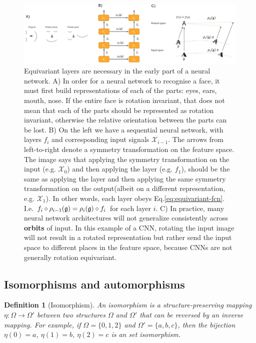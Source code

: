 \documentclass[11pt]{article}
\numberwithin{equation}{section}
\newtheorem{defn}{Definition}[section]
\begin{document}
\begin{figure}
\begin{center}
\includegraphics[width=\columnwidth]{../figures/invariance-equivariance.png}  
\end{center}
\caption{Equivariant layers are necessary in the early part of a neural network. A) In order for a neural network to recognise a face, it must first build representations of each of the parts: eyes, ears, mouth, nose. If the entire face is rotation invariant, that does not mean that each of the parts should be represented as rotation invariant, otherwise the relative orientation between the parts can be lost. B) On the left we have a sequential neural network, with layers $f_i$ and corresponding input signals $\mathcal{X}_{i-1}$. The arrows from left-to-right denote a symmetry transformation on the feature space. The image says that applying the symmetry transformation on the input (e.g. $\mathcal{X}_0$) and then applying the layer (e.g. $f_1$), should be the same as applying the layer and then applying the same symmetry transformation on the output(albeit on a different representation, e.g. $\mathcal{X}_1$). In other words, each layer obeys Eq.\eqref{eq:equivariant-fcn}. I.e. $f_i \circ \rho_{i-1}(\mathfrak{g}) = \rho_i(\mathfrak{g}) \circ f_i$ for each layer $i$. C) In practice, many neural network architectures will not generalize consistently across \textbf{orbits} of input. In this example of a CNN, rotating the input image will not result in a rotated representation but rather send the input space to different places in the feature space, because CNNs are not generally rotation equivariant.
}
\label{fig:invariance-equivariance}
\end{figure}

\subsection{Isomorphisms and automorphisms}

\begin{defn}[Isomorphism]
An isomorphism is a structure-preserving mapping $\eta: \Omega \rightarrow \Omega'$ between two structures $\Omega$ and $\Omega'$ that can be reversed by an inverse mapping. For example, if $\Omega = \{0,1,2\}$ and $\Omega' = \{a, b, c\}$, then the bijection $\eta(0)=a$, $\eta(1)=b$, $\eta(2)=c$ is an set isomorphism.
\end{defn}
\end{document}
